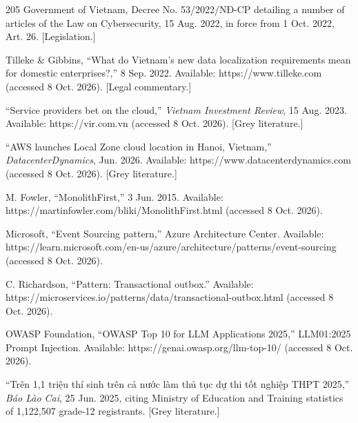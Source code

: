 \begin{thebibliography}{205}
 Government of Vietnam, Decree No. 53/\allowbreak{}2022/\allowbreak{}NĐ-\allowbreak{}CP detailing a number of articles of the Law on Cybersecurity, 15 Aug. 2022, in force from 1 Oct. 2022, Art. 26. [Legislation.\allowbreak{}]

 Tilleke \& Gibbins, ``What do Vietnam's new data localization requirements mean for domestic enterprises?,'' 8 Sep. 2022. Available: https:/\allowbreak{}/\allowbreak{}www.\allowbreak{}tilleke.\allowbreak{}com (accessed 8 Oct. 2026). [Legal commentary.\allowbreak{}]

 ``Service providers bet on the cloud,'' \textit{Vietnam Investment Review}, 15 Aug. 2023. Available: https:/\allowbreak{}/\allowbreak{}vir.\allowbreak{}com.\allowbreak{}vn (accessed 8 Oct. 2026). [Grey literature.\allowbreak{}]

 ``AWS launches Local Zone cloud location in Hanoi, Vietnam,'' \textit{DatacenterDynamics}, Jun. 2026. Available: https:/\allowbreak{}/\allowbreak{}www.\allowbreak{}datacenterdynamics.\allowbreak{}com (accessed 8 Oct. 2026). [Grey literature.\allowbreak{}]

 M. Fowler, ``MonolithFirst,'' 3 Jun. 2015. Available: https:/\allowbreak{}/\allowbreak{}martinfowler.\allowbreak{}com/\allowbreak{}bliki/\allowbreak{}MonolithFirst.\allowbreak{}html (accessed 8 Oct. 2026).

 Microsoft, ``Event Sourcing pattern,'' Azure Architecture Center. Available: https:/\allowbreak{}/\allowbreak{}learn.\allowbreak{}microsoft.\allowbreak{}com/\allowbreak{}en-\allowbreak{}us/\allowbreak{}azure/\allowbreak{}architecture/\allowbreak{}patterns/\allowbreak{}event-\allowbreak{}sourcing (accessed 8 Oct. 2026).

 C. Richardson, ``Pattern: Transactional outbox.'' Available: https:/\allowbreak{}/\allowbreak{}microservices.\allowbreak{}io/\allowbreak{}patterns/\allowbreak{}data/\allowbreak{}transactional-\allowbreak{}outbox.\allowbreak{}html (accessed 8 Oct. 2026).

 OWASP Foundation, ``OWASP Top 10 for LLM Applications 2025,'' LLM01:2025 Prompt Injection. Available: https:/\allowbreak{}/\allowbreak{}genai.\allowbreak{}owasp.\allowbreak{}org/\allowbreak{}llm-\allowbreak{}top-\allowbreak{}10/ (accessed 8 Oct. 2026).

 ``Trên 1,1 triệu thí sinh trên cả nước làm thủ tục dự thi tốt nghiệp THPT 2025,'' \textit{Báo Lào Cai}, 25 Jun. 2025, citing Ministry of Education and Training statistics of 1,122,507 grade-12 registrants. [Grey literature.\allowbreak{}]


\end{thebibliography}
